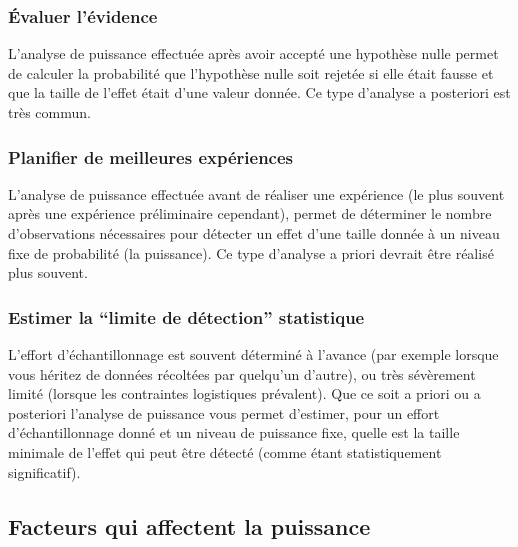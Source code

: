 \documentclass[12pt,]{book}
\begin{document}
\hypertarget{uxe9valuer-luxe9vidence}{%
\subsubsection*{Évaluer l'évidence}\label{uxe9valuer-luxe9vidence}}

L'analyse de puissance effectuée après avoir accepté une hypothèse nulle permet de calculer la probabilité que l'hypothèse nulle soit rejetée si elle était fausse et que la taille de l'effet était d'une valeur donnée.
Ce type d'analyse a posteriori est très commun.

\hypertarget{planifier-de-meilleures-expuxe9riences}{%
\subsubsection*{Planifier de meilleures expériences}\label{planifier-de-meilleures-expuxe9riences}}

L'analyse de puissance effectuée avant de réaliser une expérience (le plus souvent après une expérience préliminaire cependant), permet de déterminer le nombre d'observations nécessaires pour détecter un effet d'une taille donnée à un niveau fixe de probabilité (la puissance).
Ce type d'analyse a priori devrait être réalisé plus souvent.

\hypertarget{estimer-la-limite-de-duxe9tection-statistique}{%
\subsubsection*{Estimer la ``limite de détection'' statistique}\label{estimer-la-limite-de-duxe9tection-statistique}}

L'effort d'échantillonnage est souvent déterminé à l'avance (par exemple lorsque vous héritez de données récoltées par quelqu'un d'autre), ou très sévèrement limité (lorsque les contraintes logistiques prévalent).
Que ce soit a priori ou a posteriori l'analyse de puissance vous permet d'estimer, pour un effort d'échantillonnage donné et un niveau de puissance fixe, quelle est la taille minimale de l'effet qui peut être détecté (comme étant statistiquement significatif).

\hypertarget{facteurs-qui-affectent-la-puissance}{%
\subsection{Facteurs qui affectent la puissance}\label{facteurs-qui-affectent-la-puissance}}
\end{document}
